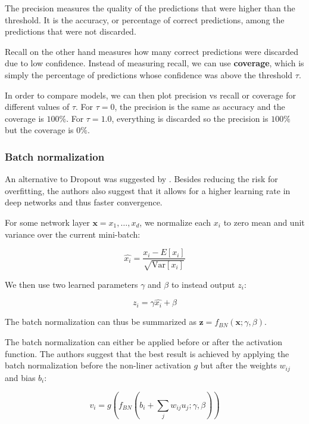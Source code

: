 The precision measures the quality of the predictions that were higher than the threshold. It is the accuracy, or percentage of correct predictions, among the predictions that were not discarded.

Recall on the other hand measures how many correct predictions were discarded due to low confidence. Instead of measuring recall, we can use \textbf{coverage}, which is simply the percentage of predictions whose confidence was above the threshold $\tau$.

In order to compare models, we can then plot precision vs recall or coverage for different values of $\tau$. For $\tau=0$, the precision is the same as accuracy and the coverage is $100\%$. For $\tau=1.0$, everything is discarded so the precision is $100\%$ but the coverage is $0\%$.

\subsubsection{Batch normalization}

An alternative to Dropout was suggested by \cite{BatchNormalization}. Besides reducing the risk for overfitting, the authors also suggest that it allows for a higher learning rate in deep networks and thus faster convergence.

For some network layer $\mathbf{x} = {x_1, \ldots, x_d}$, we normalize each $x_i$ to zero mean and unit variance over the current mini-batch:

\[
\hat{x_i} = \frac{x_i - E[x_i]}{ \sqrt{\text{Var} [x_i]} }
\]

We then use two learned parameters $\gamma$ and $\beta$ to instead output $z_i$:

\[
z_i = \gamma \hat{x_i} + \beta
\]

The batch normalization can thus be summarized as $\mathbf{z} = f_{BN}(\mathbf{x}; \gamma, \beta)$.

The batch normalization can either be applied before or after the activation function. The authors suggest that the best result is achieved by applying the batch normalization before the non-liner activation $g$ but after the weights $w_{ij}$ and bias $b_i$:

\[
v_i = g\left( f_{BN}\left( b_i + \sum_j w_{ij} u_j; \gamma, \beta \right) \right)
\]

